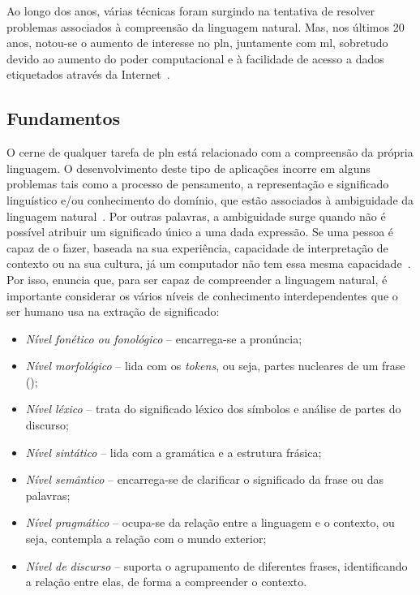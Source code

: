 Ao longo dos anos, várias técnicas foram surgindo na tentativa de resolver problemas associados à compreensão da linguagem natural. Mas, nos últimos 20 anos, notou-se o aumento de interesse no \gls{pln}, juntamente com \gls{ml}, sobretudo devido ao aumento do poder computacional e à facilidade de acesso a dados etiquetados através da Internet~\parencite{applied_natural_language_processing_with_python}.

\subsection{Fundamentos}
O cerne de qualquer tarefa de \gls{pln} está relacionado com a compreensão da própria linguagem. O desenvolvimento deste tipo de aplicações incorre em alguns problemas tais como a processo de pensamento, a representação e significado linguístico e/ou conhecimento do domínio, que estão associados à ambiguidade da linguagem natural~\parencite{nlp, pln_extracao_conhecimento}. Por outras palavras, a ambiguidade surge quando não é possível atribuir um significado único a uma dada expressão. Se uma pessoa é capaz de o fazer, baseada na sua experiência, capacidade de interpretação de contexto ou na sua cultura, já um computador não tem essa mesma capacidade~\parencite{pln_extracao_conhecimento}. Por isso, \textcite{nlp} enuncia que, para ser capaz de compreender a linguagem natural, é importante considerar os vários níveis de conhecimento interdependentes que o ser humano usa na extração de significado:

\begin{itemize}
    \item 
    {
        \textit{Nível fonético ou fonológico} -- encarrega-se a pronúncia;
    }
    \item
    {
        \textit{Nível morfológico} -- lida com os \textit{tokens}, ou seja, partes nucleares de um frase ();
    }
    \item
    {
        \textit{Nível léxico} -- trata do significado léxico dos símbolos e análise de partes do discurso;
    }
    \item 
    {
        \textit{Nível sintático} -- lida com a gramática e a estrutura frásica;
    }
    \item
    {
        \textit{Nível semântico} -- encarrega-se de clarificar o significado da frase ou das palavras;
    }
    \item
    {
        \textit{Nível pragmático} -- ocupa-se da relação entre a linguagem e o contexto, ou seja, contempla a relação com o mundo exterior;
    }
    \item
    {
        \textit{Nível de discurso} -- suporta o agrupamento de diferentes frases, identificando a relação entre elas, de forma a compreender o contexto.
    }
\end{itemize}

